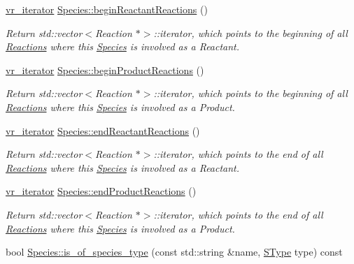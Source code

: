 \begin{DoxyCompactItemize}
\hyperlink{group__Chemistry_ga3ffcd49efdca1415b74d13f1b9fea3e4}{vr\-\_\-iterator} \hyperlink{group__Chemistry_ga2adec8a379070492b2dc48fc696b0761}{Species\-::begin\-Reactant\-Reactions} ()
\begin{DoxyCompactList}\small\item\em Return std\-::vector$<$\-Reaction $\ast$$>$\-::iterator, which points to the beginning of all \hyperlink{classReaction}{Reactions} where this \hyperlink{classSpecies}{Species} is involved as a Reactant. \end{DoxyCompactList}\item 
\hyperlink{group__Chemistry_ga3ffcd49efdca1415b74d13f1b9fea3e4}{vr\-\_\-iterator} \hyperlink{group__Chemistry_ga3cdee01c4131da3814a51282be49d83b}{Species\-::begin\-Product\-Reactions} ()
\begin{DoxyCompactList}\small\item\em Return std\-::vector$<$\-Reaction $\ast$$>$\-::iterator, which points to the beginning of all \hyperlink{classReaction}{Reactions} where this \hyperlink{classSpecies}{Species} is involved as a Product. \end{DoxyCompactList}\item 
\hyperlink{group__Chemistry_ga3ffcd49efdca1415b74d13f1b9fea3e4}{vr\-\_\-iterator} \hyperlink{group__Chemistry_ga6e3d0c6eb60588dc42141794cdcfedc4}{Species\-::end\-Reactant\-Reactions} ()
\begin{DoxyCompactList}\small\item\em Return std\-::vector$<$\-Reaction $\ast$$>$\-::iterator, which points to the end of all \hyperlink{classReaction}{Reactions} where this \hyperlink{classSpecies}{Species} is involved as a Reactant. \end{DoxyCompactList}\item 
\hyperlink{group__Chemistry_ga3ffcd49efdca1415b74d13f1b9fea3e4}{vr\-\_\-iterator} \hyperlink{group__Chemistry_ga5d0ca77f38076795ae0c6b360ac2a583}{Species\-::end\-Product\-Reactions} ()
\begin{DoxyCompactList}\small\item\em Return std\-::vector$<$\-Reaction $\ast$$>$\-::iterator, which points to the end of all \hyperlink{classReaction}{Reactions} where this \hyperlink{classSpecies}{Species} is involved as a Product. \end{DoxyCompactList}\item 
bool \hyperlink{group__Chemistry_ga6c195460f85013bc5d02202709bbfdfb}{Species\-::is\-\_\-of\-\_\-species\-\_\-type} (const std\-::string \&name, \hyperlink{group__Chemistry_ga49104ff0a7d4118feb179c2f1c906f12}{S\-Type} type) const 

\end{DoxyCompactItemize}
